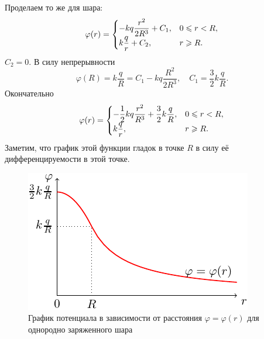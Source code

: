 	Проделаем то же для шара:
	\begin{equation}
		\varphi(r)=\begin{cases}
						-kq\dfrac{r^2}{2R^3}+C_1,& \text{$0\leqslant r<R$},\\
						k\dfrac{q}{r} + C_2,& \text{$r\geqslant R$}.
					\end{cases}
	\end{equation}
	$C_2=0$. В силу непрерывности
		$$\varphi(R)=k\frac{q}{R}=C_1-kq\frac{R^2}{2R^3}, \quad C_1=\frac{3}{2}k\frac{q}{R}.$$
	Окончательно
	\begin{equation}
		\varphi(r)=\begin{cases}
						-\dfrac{1}{2}kq\dfrac{r^2}{R^3}+\dfrac{3}{2}k\dfrac{q}{R},& \text{$0\leqslant r<R$},\\
						k\dfrac{q}{r},& \text{$r\geqslant R$}.
					\end{cases}
	\end{equation}
	Заметим, что график этой функции гладок в точке $R$ в силу её дифференцируемости в этой точке. 
	\begin{figure}[t]
		\centering
		\includegraphics[scale=2]{./img/plot4/plot4.pdf}
		\caption{График потенциала в зависимости от расстояния $\varphi=\varphi(r)$ для однородно заряженного шара}
	\end{figure}